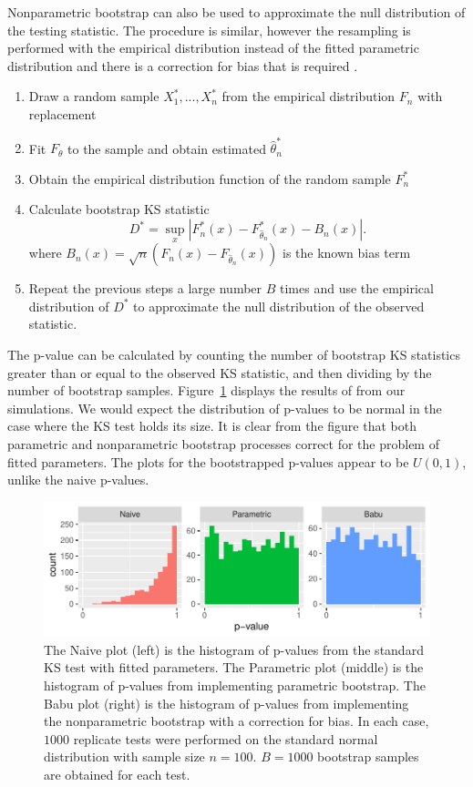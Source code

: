 \documentclass[12pt, letterpaper, titlepage]{article}
\begin{document}
Nonparametric bootstrap can also be used to approximate the null distribution 
of the testing statistic. The procedure is similar, however the resampling is 
performed with the empirical distribution instead of the fitted parametric
distribution and there is a correction for bias that is required
\citep{Babu}.
\begin{enumerate}
  \item 
    Draw a random sample $X_1^*,...,X_n^*$ from the empirical distribution $F_n$
    with replacement
  \item 
    Fit $F_\theta$ to the sample and obtain estimated $\hat\theta_n^*$
  \item
    Obtain the empirical distribution function of the random sample $F_n^*$
  \item 
    Calculate bootstrap KS statistic
    \[
      D^* = \sup_x | F_n^* (x)- F_{\hat\theta_n}^*(x) - B_n(x) |.
    \]
    where $B_{n}(x) = \sqrt{n}(F_{n}(x) - F_{\hat\theta_n}(x))$ is the known 
    bias term \citep{Babu}
  \item
    Repeat the previous steps a large number $B$ times and use the empirical 
    distribution of $D^*$ to approximate the null distribution of the observed 
    statistic.
\end{enumerate}
The p-value can be calculated by counting the number of bootstrap KS 
statistics greater than or equal to the observed KS statistic, and then dividing 
by the number of bootstrap samples. Figure~\ref{fig:hist_fitted} displays the 
results of from our simulations. We would expect the distribution of p-values 
to be normal in the case where the KS test holds its size. It is clear from the 
figure that both parametric and nonparametric bootstrap processes correct for 
the problem of fitted parameters. The plots for the bootstrapped p-values appear
to be $U(0,1)$, unlike the naive p-values.

\begin{figure}[tbp]
  \centering
  \includegraphics[width=\textwidth]{hist_fitted}
  \caption{The Naive plot (left) is the histogram of p-values from the standard 
  KS test with fitted parameters. The Parametric plot (middle) is the histogram
  of p-values from implementing parametric bootstrap. The Babu plot (right) is 
  the histogram of p-values from implementing the nonparametric bootstrap with a 
  correction for bias. In each case, $1000$ replicate tests were performed on 
  the standard normal distribution with sample size $n = 100$. $B = 1000$ 
  bootstrap samples are obtained for each test.}
  \label{fig:hist_fitted}
\end{figure}
\end{document}
